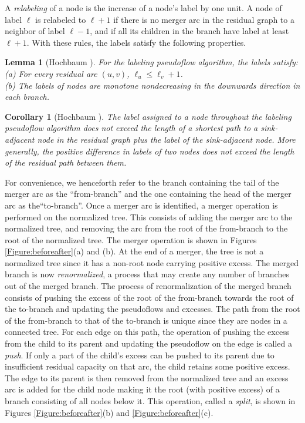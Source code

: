 \documentclass{article}
\newtheorem{lemma}{Lemma}[section]
\newtheorem{corollary}{Corollary}[section]
\begin{document}
A {\em relabeling} of a node is the increase of a node's label by one unit.  A node of label $\ell$ is relabeled to $\ell +1$ if there is no merger arc in the residual graph to a neighbor of label $\ell-1$, and if all its children in the branch have label at least $\ell +1$. With these rules, the labels satisfy the following properties.

\begin{lemma}[Hochbaum \cite{Hoc97, Hoc07}]
\label{lem:labels}
For the labeling pseudoflow algorithm, the labels satisfy:\\
(a) For every residual arc $(u,v)$, $\ell _u\leq \ell _v +1$.\\
(b) The labels of nodes are monotone nondecreasing in the downwards direction in each branch.
\end{lemma}

\begin{corollary}[Hochbaum \cite{Hoc97, Hoc07}]
\label{cor:res-path} The label assigned to a node throughout the labeling pseudoflow algorithm does not exceed the length of a shortest path to a sink-adjacent node in the residual graph plus the label of the sink-adjacent node.  More generally, the positive difference in labels of two nodes does not exceed the length of the residual path between them.
\end{corollary}

For convenience, we henceforth refer to the branch containing the tail of the merger arc as the ``from-branch'' and the one containing the head of the merger arc as the``to-branch''. Once a merger arc is identified, a merger operation is performed on the normalized tree. This consists of adding the merger arc to the normalized tree, and removing the arc from the root of the from-branch to the root of the normalized tree. The merger operation is shown in Figures \ref{Figure:beforeafter}(a) and (b). At the end of a merger, the tree is not a normalized tree since it has a non-root node carrying positive excess. The merged branch is now {\em renormalized}, a process that may create any number of branches out of the merged branch. The process of renormalization of the merged branch consists of pushing the excess of the root of the from-branch towards the root of the to-branch and updating the pseudoflows and excesses. The path from the root of the from-branch to that of the to-branch is unique since they are nodes in a connected tree. For each edge on this path, the operation of pushing the excess from the child to its parent and updating the pseudoflow on the edge is called a {\em push}. If only a part of the child's excess can be pushed to its parent due to insufficient residual capacity on that arc, the child retains some positive excess. The edge to its parent is then removed from the normalized tree and an excess arc is added for the child node making it the root (with positive excess) of a branch consisting of all nodes below it. This operation, called a {\em split}, is shown in Figures \ref{Figure:beforeafter}(b) and \ref{Figure:beforeafter}(c).
\end{document}
